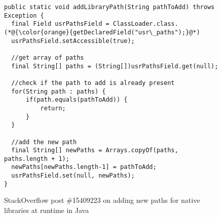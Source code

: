\begin{figure}[t]%
	\centering
\begin{lstlisting}[]
public static void addLibraryPath(String pathToAdd) throws Exception {
  final Field usrPathsField = ClassLoader.class.(*@{\color{orange}{getDeclaredField("usr\_paths");}@*)
  usrPathsField.setAccessible(true);

  //get array of paths
  final String[] paths = (String[])usrPathsField.get(null);

  //check if the path to add is already present
  for(String path : paths) {
      if(path.equals(pathToAdd)) {
          return;
      }
  }

  //add the new path
  final String[] newPaths = Arrays.copyOf(paths, paths.length + 1);
  newPaths[newPaths.length-1] = pathToAdd;
  usrPathsField.set(null, newPaths);
}
\end{lstlisting}
        \vspace{-16pt}
        \caption{StackOverflow post \#15409223 on adding new paths for
          native libraries at runtime in Java}
        \label{fig:example1}
\end{figure}
